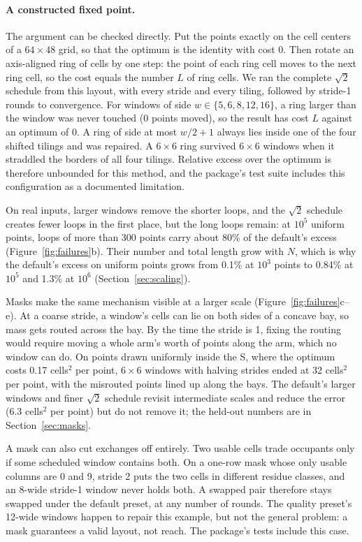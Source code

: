 \paragraph{A constructed fixed point.} The argument can be checked directly. Put the
points exactly on the cell centers of a $64\times48$ grid, so that the optimum is the
identity with cost 0. Then rotate an axis-aligned ring of cells by one step: the point of
each ring cell moves to the next ring cell, so the cost equals the number $L$ of ring
cells. We ran the complete $\sqrt2$ schedule from this layout, with every stride and
every tiling, followed by stride-1 rounds to convergence. For windows of side
$w\in\{5,6,8,12,16\}$, a ring larger than the window was never touched (0 points moved), so
the result has cost $L$ against an optimum of 0. A ring of side at most $w/2+1$ always
lies inside one of the four shifted tilings and was repaired. A $6\times6$ ring
survived $6\times6$ windows when it straddled the borders of all four tilings. Relative
excess over the optimum is therefore unbounded for this method, and the package's test
suite includes this configuration as a documented limitation.

On real inputs, larger windows remove the shorter loops, and the $\sqrt2$ schedule creates
fewer loops in the first place, but the long loops remain: at $10^5$ uniform points, loops of
more than 300 points carry about 80\% of the default's excess (Figure~\ref{fig:failures}b).
Their number and total length grow with $N$, which is why the default's excess on
uniform points grows from 0.1\% at $10^3$ points to 0.84\% at $10^5$ and 1.3\% at $10^6$
(Section~\ref{sec:scaling}).

Masks make the same mechanism visible at a larger scale (Figure~\ref{fig:failures}c--e).
At a coarse stride, a window's cells can lie on both sides of a concave bay, so mass
gets routed across the bay. By the time the stride is 1, fixing the routing would
require moving a whole arm's worth of points along the arm, which no window can do.
On points drawn uniformly inside the S, where the optimum costs 0.17 cells$^2$ per point, $6\times6$
windows with halving strides ended at 32 cells$^2$ per point, with the misrouted points lined up
along the bays. The default's larger windows and finer $\sqrt2$ schedule revisit
intermediate scales and reduce the error (6.3 cells$^2$ per point) but do not remove it; the
held-out numbers are in Section~\ref{sec:masks}.

A mask can also cut exchanges off entirely. Two usable cells trade occupants only if some
scheduled window contains both. On a one-row mask whose only usable columns are 0 and 9,
stride 2 puts the two cells in different residue classes, and an 8-wide stride-1 window never
holds both. A swapped pair therefore stays swapped under the default preset, at any number of
rounds. The quality preset's 12-wide windows happen to repair this example, but not the
general problem: a mask guarantees a valid layout, not reach. The package's tests include
this case.
